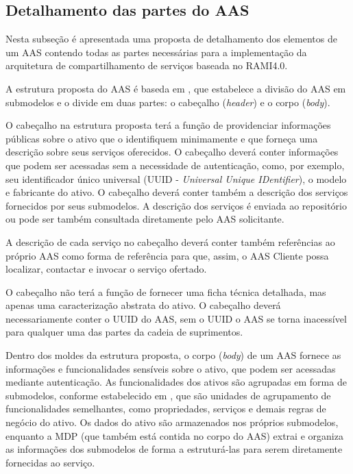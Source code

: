 	
	\subsection{Detalhamento das partes do AAS}

	Nesta subseção é apresentada uma proposta de detalhamento dos elementos de um AAS contendo todas as partes necessárias para a implementação da arquitetura de compartilhamento de serviços baseada no RAMI4.0. 
	
	A estrutura proposta do AAS é baseda em , que estabelece a divisão do AAS em submodelos e o divide em duas partes: o cabeçalho (\textit{header}) e o corpo (\textit{body}).
	
	O cabeçalho na estrutura proposta terá a função de providenciar informações públicas sobre o ativo que o identifiquem minimamente e que forneça uma descrição sobre seus serviços oferecidos. O cabeçalho deverá conter informações que podem ser acessadas sem a necessidade de autenticação, como, por exemplo, seu identificador único universal (UUID - \textit{Universal Unique IDentifier}), o modelo e fabricante do ativo. O cabeçalho deverá conter também a descrição dos serviços fornecidos por seus submodelos. A descrição dos serviços é enviada ao repositório ou pode ser também consultada diretamente pelo AAS solicitante.
	
	A descrição de cada serviço no cabeçalho deverá conter também referências ao próprio AAS como forma de referência para que, assim, o AAS Cliente possa localizar, contactar e invocar o serviço ofertado.
	
	O cabeçalho não terá a função de fornecer uma ficha técnica detalhada, mas apenas uma caracterização abstrata do ativo. O cabeçalho deverá necessariamente conter o UUID do AAS, sem o UUID o AAS se torna inacessível para qualquer uma das partes da cadeia de suprimentos.
	
	Dentro dos moldes da estrutura proposta, o corpo (\textit{body}) de um AAS fornece as informações e funcionalidades sensíveis sobre o ativo, que podem ser acessadas mediante autenticação. As funcionalidades dos ativos são agrupadas em forma de submodelos, conforme estabelecido em , que são unidades de agrupamento de funcionalidades semelhantes, como propriedades, serviços e demais regras de negócio do ativo. Os dados do ativo são armazenados nos próprios submodelos, enquanto a MDP (que também está contida no corpo do AAS) extrai e organiza as informações dos submodelos de forma a estruturá-las para serem diretamente fornecidas ao serviço.
	
